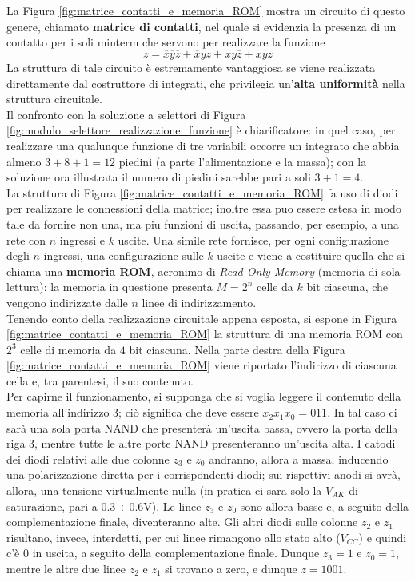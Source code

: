 \documentclass[a4paper]{extarticle}
\begin{document}
\noindent
La Figura \ref{fig:matrice_contatti_e_memoria_ROM} mostra un circuito di questo genere, chiamato \textbf{matrice di contatti}, nel quale si evidenzia la presenza di un contatto per i soli minterm che servono per realizzare la funzione
\[z = \overline{x}\overline{y}\overline{z} + \overline{x}yz + xy\overline{z} + xyz\]
La struttura di tale circuito è estremamente vantaggiosa se viene realizzata direttamente dal costruttore di integrati, che privilegia un’\textbf{alta uniformità} nella struttura circuitale.\\
Il confronto con la soluzione a selettori di Figura \ref{fig:modulo_selettore_realizzazione_funzione} è chiarificatore: in quel caso, per realizzare una qualunque funzione di tre variabili occorre un integrato che abbia almeno $3 + 8 + 1 = 12$ piedini (a parte l’alimentazione e la massa); con la soluzione ora illustrata il numero di piedini sarebbe pari a soli $3 + 1 = 4$.\\
La struttura di Figura \ref{fig:matrice_contatti_e_memoria_ROM} fa uso di diodi per realizzare le connessioni della matrice; inoltre essa puo essere estesa in modo tale
da fornire non una, ma piu funzioni di uscita, passando, per esempio, a una rete con $n$ ingressi e $k$ uscite. Una simile rete fornisce, per ogni configurazione degli $n$ ingressi, una configurazione sulle $k$ uscite e viene a costituire quella che
si chiama una \textbf{memoria ROM}, acronimo di \emph{Read Only Memory} (memoria di sola lettura): la memoria in questione presenta $M = 2^n$ celle da $k$ bit ciascuna, che vengono indirizzate dalle $n$ linee di indirizzamento.\\
Tenendo conto della realizzazione circuitale appena esposta, si espone in Figura \ref{fig:matrice_contatti_e_memoria_ROM} la struttura di una memoria ROM con $2^3$ celle di memoria da $4$ bit ciascuna. Nella parte destra della Figura \ref{fig:matrice_contatti_e_memoria_ROM} viene riportato l’indirizzo di ciascuna cella e, tra parentesi, il suo contenuto.\\
Per capirne il funzionamento, si supponga che si voglia leggere il contenuto della memoria all’indirizzo 3; ciò significa che deve essere $x_2x_1x_0 = 011$. In tal caso ci sarà una sola porta NAND che presenterà un’uscita bassa, ovvero la porta della riga $3$, mentre tutte le altre porte NAND presenteranno un'uscita alta. I catodi dei diodi relativi alle due colonne $z_3$ e $z_0$ andranno, allora a massa, inducendo una polarizzazione diretta per i corrispondenti diodi; sui rispettivi anodi si avrà, allora, una tensione virtualmente nulla (in pratica ci sara solo la $V_{AK}$ di saturazione, pari a $0.3 \div 0.6$V). Le linee $z_3$ e $z_0$ sono allora basse e, a seguito della complementazione finale, diventeranno alte. Gli altri diodi sulle colonne $z_2$ e $z_1$ risultano, invece, interdetti, per cui linee rimangono allo stato alto ($V_{CC}$) e quindi c’è $0$ in uscita, a seguito della complementazione finale. Dunque $z_3 = 1$ e $z_0 = 1$, mentre le altre due linee $z_2$ e $z_1$ si trovano a zero, e dunque $z = 1001$.
\end{document}
